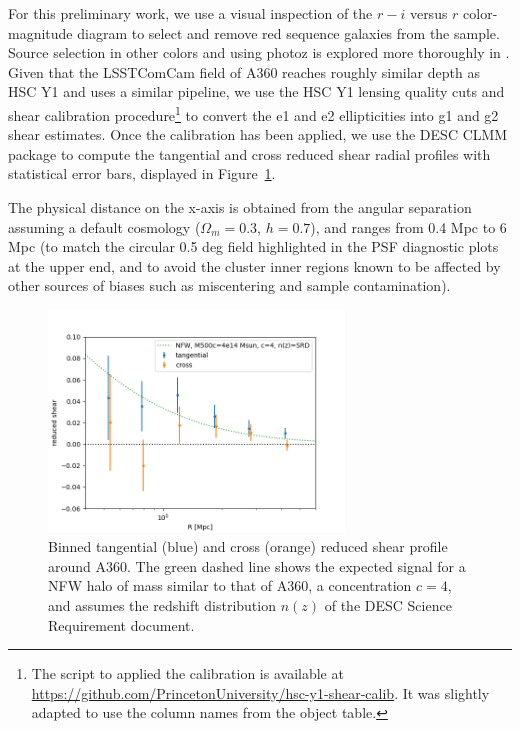 \documentclass[SE,lsstdraft,authoryear,toc]{lsstdoc}
\begin{document}
For this preliminary work, we use a visual inspection of the $r-i$ versus $r$ color-magnitude diagram to select and remove red sequence galaxies from the sample. Source selection in other colors and using photoz is explored more thoroughly in . 
Given that the LSSTComCam field of A360 reaches roughly similar depth as HSC Y1 and uses a similar pipeline, we use the HSC Y1 lensing quality cuts and shear calibration procedure\footnote{The script to applied the calibration is available at \url{https://github.com/PrincetonUniversity/hsc-y1-shear-calib}. It was slightly adapted to use the column names from the object table.} \citep{2018MNRAS.481.3170M} to convert the e1 and e2 ellipticities into g1 and g2 shear estimates. Once the calibration has been applied, we use the DESC CLMM package \citep{2021MNRAS.508.6092A} to compute the tangential and cross reduced shear radial profiles with statistical error bars, displayed in Figure~\ref{fig:shear_profile}. 

The physical distance on the x-axis is obtained from the angular separation assuming a default cosmology ($\Omega_m=0.3$, $h=0.7$), and ranges from 0.4 Mpc to 6 Mpc (to match the circular 0.5 deg field highlighted in the PSF diagnostic plots at the upper end, and to avoid the cluster inner regions known to be affected by other sources of biases such as miscentering and sample contamination). 

\begin{figure}
\centering
\includegraphics[width=0.7\textwidth]{Figures/shear_profile.png}
\caption{Binned tangential (blue) and cross (orange) reduced shear profile around A360. The green dashed line shows the expected signal for a NFW halo of mass similar to that of A360, a concentration $c=4$, and assumes the redshift distribution $n(z)$ of the DESC Science Requirement document. \label{fig:shear_profile}}
\end{figure}
\end{document}
